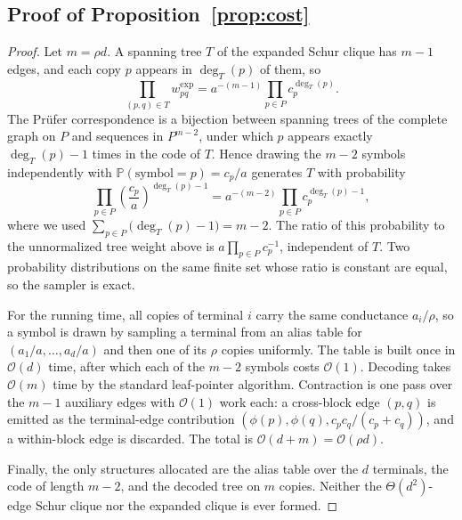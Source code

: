 \documentclass{article}
\newcommand{\calO}{\mathcal{O}}
\newcommand{\bigO}{\calO}
\newcommand{\1}{\mathbbm{1}}
\theoremstyle{plain}
\renewcommand{\Pr}[1]{\mathbb{P}\left(#1\right)}
\begin{document}
\subsection{Proof of Proposition~\ref{prop:cost}}
\label{app:prop_cost}
\begin{proof}
Let $m=\rho d$. A spanning tree $T$ of the expanded Schur clique has
$m-1$ edges, and each copy $p$ appears in $\deg_T(p)$ of them, so
\begin{equation*}
\prod_{(p,q)\in T} w_{pq}^{\mathrm{exp}}
= a^{-(m-1)} \prod_{p\in P} c_p^{\deg_T(p)} .
\end{equation*}
The Pr\"ufer correspondence is a bijection between spanning trees of
the complete graph on $P$ and sequences in $P^{m-2}$, under which $p$
appears exactly $\deg_T(p)-1$ times in the code of $T$. Hence drawing
the $m-2$ symbols independently with $\Pr{\text{symbol}=p}=c_p/a$
generates $T$ with probability
\begin{equation*}
\prod_{p\in P} \left(\frac{c_p}{a}\right)^{\deg_T(p)-1}
= a^{-(m-2)} \prod_{p\in P}c_p^{\deg_T(p)-1},
\end{equation*}
where we used $\sum_{p\in P}\bigl(\deg_T(p)-1\bigr)=m-2$. The ratio of
this probability to the unnormalized tree weight above is
$a\prod_{p\in P}c_p^{-1}$, independent of $T$. Two probability
distributions on the same finite set whose ratio is constant are
equal, so the sampler is exact.

For the running time, all copies of terminal $i$ carry the same
conductance $a_i/\rho$, so a symbol is drawn by sampling a terminal
from an alias table for $(a_1/a,\ldots,a_d/a)$ and then one of its
$\rho$ copies uniformly. The table is built once in $\bigO(d)$ time,
after which each of the $m-2$ symbols costs $\bigO(1)$. Decoding takes
$\bigO(m)$ time by the standard leaf-pointer algorithm. Contraction is
one pass over the $m-1$ auxiliary edges with $\bigO(1)$ work each: a
cross-block edge $(p,q)$ is emitted as the terminal-edge contribution
$(\phi(p),\phi(q),c_pc_q/(c_p+c_q))$, and a within-block edge is
discarded. The total is $\bigO(d+m)=\bigO(\rho d)$.

Finally, the only structures allocated are the alias table over the
$d$ terminals, the code of length $m-2$, and the decoded tree on $m$
copies. Neither the $\Theta(d^2)$-edge Schur clique nor the expanded
clique is ever formed.
\end{proof}
\end{document}
